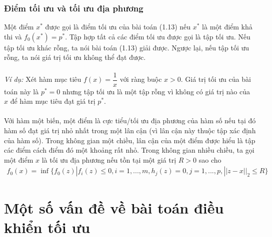 \documentclass[12pt,a4paper]{report}
\begin{document}
\subsection{Điểm tối ưu và tối ưu địa phương}
Một điểm $x^*$ được gọi là điểm tối ưu của bài toán (1.13) nếu $x^*$ là một điểm khả thi và $f_0(x^*) = p^*$. Tập hợp tất cả các điểm tối ưu được gọi là tập tối ưu. Nếu tập tối ưu khác rỗng, ta nói bài toán (1.13) giải được. Ngược lại, nếu tập tối ưu rỗng, ta nói giá trị tối ưu không thể đạt được.\\\\ \textit{Ví dụ:} Xét hàm mục tiêu $f(x) = \dfrac{1}{x}$ với ràng buộc $x>0$. Giá trị tối ưu của bài toán này là $p^* = 0$ nhưng tập tối ưu là một tập rỗng vì không có giá trị nào của $x$ để hàm mục tiêu đạt giá trị $p^*$. \\\\ Với hàm một biến, một điểm là cực tiểu/tối ưu địa phương của hàm số nếu tại đó hàm số đạt giá trị nhỏ nhất trong một  lân cận (vì lân cận này thuộc tập xác định của hàm số). Trong không gian một chiều, lân cận của một điểm được hiểu là tập các điểm cách điểm đó một khoảng rất nhỏ. Trong không gian nhiều chiều, ta gọi một điểm $x$ là tối ưu địa phương nếu  tồn tại một giá trị $R > 0$ sao cho 
\begin{eqnarray}
	f_0(x) = \inf\{f_0(z)|f_i(z)\leq 0, i =1,..., m, h_j(z) = 0, j=1,..., p, ||z-x||_2 \leq R\} \nonumber
\end{eqnarray} 
\chapter{Một số vấn đề về bài toán điều khiển tối ưu}
\end{document}
